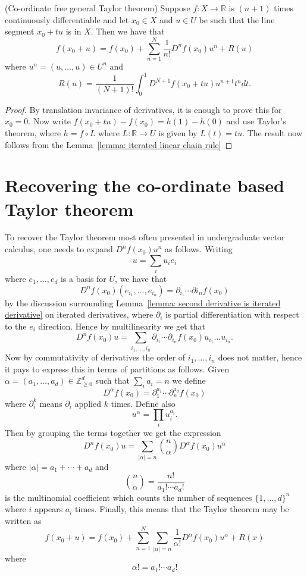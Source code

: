 \documentclass[twoside, a4paper, 10pt]{amsart}
\begin{document}
\begin{thm}(Co-ordinate free general Taylor theorem) Suppose $f:X \to \mathbb{R}$ is $(n+1)$ times continuously differentiable and let $x_0 \in X$ and $u \in U$ be such that the line segment $x_0 + tu$ is in $X$. Then we have that $$f(x_0 + u) = f(x_0) + \sum_{n=1}^N \frac{1}{n!} D^n f(x_0) u^n + R(u)$$ where $u^n = (u, \ldots, u) \in U^n$ and $$R(u) =\frac{1}{(N+1)!} \int_{0}^1 D^{N+1}f(x_0 + tu)u^{n+1} t^n dt  .$$  \end{thm}

\begin{proof} By translation invariance of derivatives, it is enough to prove this for $x_0 = 0$. Now write $f(x_0 + tu) - f(x_0) = h(1) - h(0)$ and use Taylor's theorem, where $h = f \circ L$ where $L:\mathbb{R} \to U$ is given by $L(t) = tu$. The result now follows from the Lemma~\ref{lemma: iterated linear chain rule} 
\end{proof}

\section{Recovering the co-ordinate based Taylor theorem}

To recover the Taylor theorem most often presented in undergraduate vector calculus, one needs to expand $D^nf(x_0) u^n$ as follows. Writing $$u = \sum_i u_i e_i$$ where $e_1, \ldots, e_d$ is a basis for $U$, we have that $$D^nf(x_0) (e_{i_1}, \ldots, e_{i_n}) = \partial_{i_1} \cdots \partial{i_n}f(x_0)$$ by the discussion surrounding Lemma~\ref{lemma: second derivative is iterated derivative} on iterated derivatives, where $\partial_i$ is partial differentiation with respect to the $e_i$ direction. Hence by multilinearity we get that $$D^nf(x_0)u = \sum_{i_1, \ldots, i_n} \partial_{i_1} \cdots \partial_{i_n}f(x_0) u_{i_1} \ldots u_{i_n}.$$ Now by commutativity of derivatives the order of $i_1, \ldots, i_n$ does not matter, hence it pays to express this in terms of partitions as follows. Given $\alpha = (a_1, \ldots, a_d) \in \mathbb{Z}_{\geq 0}^d$ such that $\sum_i a_i = n$ we define $$D^{\alpha}f(x_0) = \partial_1^{a_1} \cdots \partial_n^{a_d} f(x_0)$$ where $\partial_i^{k}$ means $\partial_i$ applied $k$ times. Define also $$u^{\alpha} = \prod_{i} u_i^{a_i}.$$ Then by grouping the terms together we get the expression $$D^n f(x_0) u = \sum_{|\alpha| = n} \binom{n}{\alpha} D^{\alpha}f(x_0) u ^{\alpha}$$ where $|\alpha| = a_1 + \cdots + a_d$ and $$\binom{n}{\alpha} = \frac{n!}{a_1 ! \cdots a_d!}$$ is the multinomial coefficient which counts the number of sequences $\{1, \ldots, d\}^n$ where $i$ appears $a_i$ times. Finally, this means that the Taylor theorem may be written as $$ f(x_0 + u ) = f(x_0) + \sum_{n=1}^N \sum_{|\alpha| = n} \frac{1}{\alpha!} D^{\alpha}f(x_0) u^{\alpha}  + R(x) $$ where $$ \alpha! = a_1! \cdots a_d!$$
\end{document}
